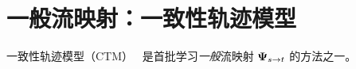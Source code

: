        
        
        
        








\clearpage
\newpage

\section{\texorpdfstring{一般流映射：一致性轨迹模型}{General Flow Map: Consistency Trajectory Model}}\label{sec:CTM}

一致性轨迹模型（CTM）~\citep{kim2023consistency} 是首批学习\emph{一般}流映射 ${\bm{\Psi}}_{s\to t}$ 的方法之一。



